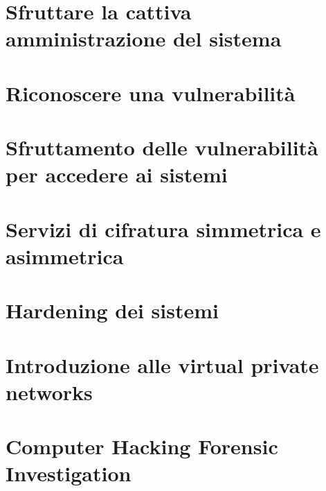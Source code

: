 \chapter{Sfruttare la cattiva amministrazione del sistema}				%
    
\chapter{Riconoscere una vulnerabilità} 								%

\chapter{Sfruttamento delle vulnerabilità per accedere ai sistemi}		%
 
\chapter{Servizi di cifratura simmetrica e asimmetrica}					%
 
 \chapter{Hardening dei sistemi}                    					%
 
\chapter{Introduzione alle virtual private networks}					%
 
 \chapter{Computer Hacking Forensic Investigation}                      %